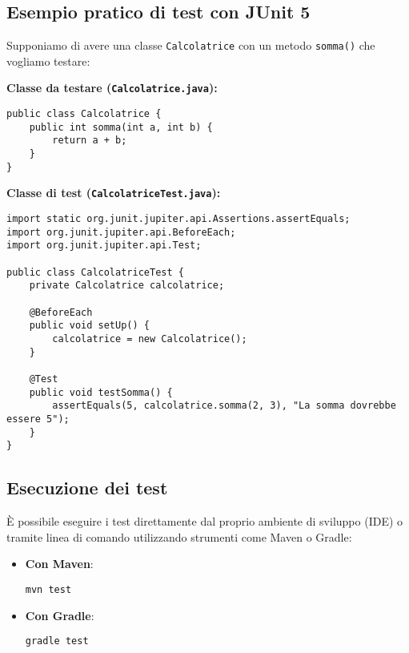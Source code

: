 \documentclass{article}
\begin{document}
\subsection{Esempio pratico di test con JUnit 5}
Supponiamo di avere una classe \texttt{Calcolatrice} con un metodo \texttt{somma()} che vogliamo testare:

\textbf{Classe da testare (\texttt{Calcolatrice.java}):}
\begin{lstlisting}
public class Calcolatrice {
    public int somma(int a, int b) {
        return a + b;
    }
}
\end{lstlisting}

\textbf{Classe di test (\texttt{CalcolatriceTest.java}):}
\begin{lstlisting}
import static org.junit.jupiter.api.Assertions.assertEquals;
import org.junit.jupiter.api.BeforeEach;
import org.junit.jupiter.api.Test;

public class CalcolatriceTest {
    private Calcolatrice calcolatrice;

    @BeforeEach
    public void setUp() {
        calcolatrice = new Calcolatrice();
    }

    @Test
    public void testSomma() {
        assertEquals(5, calcolatrice.somma(2, 3), "La somma dovrebbe essere 5");
    }
}
\end{lstlisting}

\subsection{Esecuzione dei test}
È possibile eseguire i test direttamente dal proprio ambiente di sviluppo (IDE) o tramite linea di comando utilizzando strumenti come Maven o Gradle:

\begin{itemize}
    \item \textbf{Con Maven}:
    \begin{lstlisting}
mvn test
    \end{lstlisting}
    
    \item \textbf{Con Gradle}:
    \begin{lstlisting}
gradle test
    \end{lstlisting}
\end{itemize}
\end{document}
